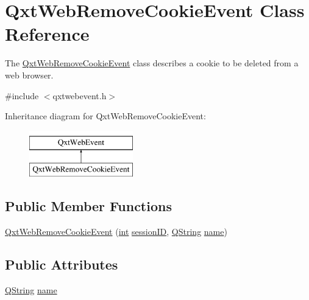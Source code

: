 \hypertarget{class_qxt_web_remove_cookie_event}{\section{Qxt\-Web\-Remove\-Cookie\-Event Class Reference}
\label{class_qxt_web_remove_cookie_event}
}


The \hyperlink{class_qxt_web_remove_cookie_event}{Qxt\-Web\-Remove\-Cookie\-Event} class describes a cookie to be deleted from a web browser.  




{\ttfamily \#include $<$qxtwebevent.\-h$>$}

Inheritance diagram for Qxt\-Web\-Remove\-Cookie\-Event\-:\begin{figure}[H]
\begin{center}
\leavevmode
\includegraphics[height=2.000000cm]{class_qxt_web_remove_cookie_event}
\end{center}
\end{figure}
\subsection*{Public Member Functions}
\begin{DoxyCompactItemize}
\item 
\hyperlink{class_qxt_web_remove_cookie_event_a41ae4fa307148cd064ca9ecacac13336}{Qxt\-Web\-Remove\-Cookie\-Event} (\hyperlink{ioapi_8h_a787fa3cf048117ba7123753c1e74fcd6}{int} \hyperlink{class_qxt_web_event_a3fdb1d80c46e535c2c79a06269a5d307}{session\-I\-D}, \hyperlink{group___u_a_v_objects_plugin_gab9d252f49c333c94a72f97ce3105a32d}{Q\-String} \hyperlink{glext_8h_ad977737dfc9a274a62741b9500c49a32}{name})
\end{DoxyCompactItemize}
\subsection*{Public Attributes}
\begin{DoxyCompactItemize}
\item 
\hyperlink{group___u_a_v_objects_plugin_gab9d252f49c333c94a72f97ce3105a32d}{Q\-String} \hyperlink{class_qxt_web_remove_cookie_event_a843824ad7369eb86af7c966dc0048657}{name}
\end{DoxyCompactItemize}
